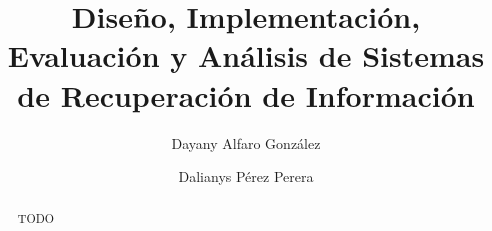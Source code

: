 \documentclass{llncs}
\begin{document}
%
%
\mainmatter              %
%
\title{ Diseño, Implementación,
	Evaluación y Análisis de Sistemas de Recuperación de Información}
%
%
\author{Dayany Alfaro González \and Dalianys Pérez Perera}
%
%
%
\institute{Universidad de La Habana, San Lázaro y L, Plaza de la Revolución, La Habana, Cuba%
}

\maketitle              %

\begin{abstract}
TODO


\end{abstract}
%
\end{document}
